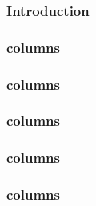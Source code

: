 \subsubsection{Introduction \lispDone{}}                              \label{hub: descriptions: scenarios: intro}              
\subsubsection{\scenCall{} columns \lispDone{}}                       \label{hub: descriptions: scenarios: call}               
\subsubsection{\scenCreate{} columns \lispDone{}}                     \label{hub: descriptions: scenarios: create}             
\subsubsection{\scenReturn{} columns \lispDone{}}                     \label{hub: descriptions: scenarios: return}             
\subsubsection{\scenPrecompile{} columns \lispDone{}}                 \label{hub: descriptions: scenarios: precompile}         
\subsubsection{\scenSelfdestruct{} columns \lispDone{}}               \label{hub: descriptions: scenarios: selfdestruct}       
